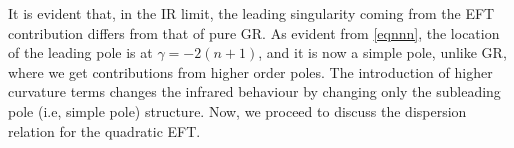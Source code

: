 It is evident that, in the IR limit, the leading singularity coming from the EFT contribution differs from that of pure GR. As evident from \eqref{eqnnn}, the location of the leading pole is at $\gamma=-2(n+1)$, and it is now a simple pole, unlike GR, where we get contributions from higher order poles. The introduction of higher curvature terms changes the infrared behaviour by changing only the subleading pole (i.e, simple pole) structure. Now, we proceed to discuss the dispersion relation for the quadratic EFT.
